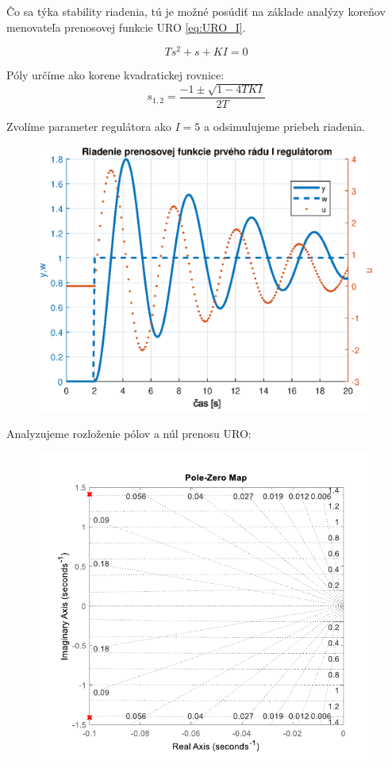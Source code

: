 \documentclass[a4paper,10pt]{article}
\begin{document}
Čo sa týka stability riadenia, tú je možné posúdiť na základe analýzy koreňov menovateľa prenosovej funkcie URO \eqref{eq:URO_I}. 

\begin{equation}
  Ts^2+s+KI=0
\end{equation} 

Póly určíme ako korene kvadratickej rovnice:
\begin{equation}
  s_{1,2}=\frac{-1\pm \sqrt{1-4TKI}}{2T}
\end{equation}

Zvolíme parameter regulátora ako $I=5$ a odsimulujeme priebeh riadenia.
\begin{figure}[ht]
\centering
\includegraphics[scale=0.55]{I_control}
\end{figure}

Analyzujeme rozloženie pólov a núl prenosu URO:
\begin{figure}[ht]
\centering
\includegraphics[scale=0.75]{pzmap_I}
\end{figure}
\end{document}

